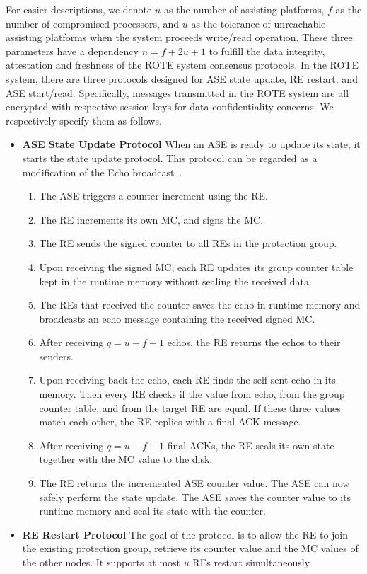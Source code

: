 For easier descriptions, we denote $n$ as the number of assisting platforms, $f$ as the number of compromised processors, and $u$ as the tolerance of  unreachable assisting platforms when the system proceeds write/read operation. These three parameters have a dependency $n = f + 2u + 1$ to fulfill the data integrity, attestation and freshness of the ROTE system consensus protocols. In the ROTE system, there are three protocols designed for ASE state update, RE restart, and ASE start/read. Specifically, messages transmitted in the ROTE system are all encrypted with respective session keys for data confidentiality concerns. We respectively specify them as follows.
\begin{itemize}
	\item \textbf{ASE State Update Protocol} When an ASE is ready to update its state, it starts the state update protocol. This protocol can be regarded as a modification of the Echo broadcast~\cite{}. 
	\begin{enumerate}
		\item The ASE triggers a counter increment using the RE.
		\item The RE increments its own MC, and signs the MC. 
		\item The RE sends the signed counter to all REs in the protection group.
		\item Upon receiving the signed MC, each RE updates its group counter table kept in the runtime memory without sealing the received data.
		\item The REs that received the counter saves the echo in runtime memory and broadcasts an echo message containing the received signed MC.
		\item After receiving $q=u+f+1$ echos, the RE returns the echos to their senders.
		\item Upon receiving back the echo, each RE finds the self-sent echo in its memory. Then every RE checks if the value from echo, from the group counter table, and from the target RE are equal. If these three values match each other, the RE replies with a final ACK message.
		\item After receiving $q=u+f+1$ final ACKs, the RE seals its own state together with the MC value to the disk.
		\item The RE returns the incremented ASE counter value. The ASE can now safely perform the state update. The ASE saves the counter value to its runtime memory and seal its state with the counter.
	\end{enumerate}
	\item \textbf{RE Restart Protocol} The goal of the protocol is to allow the RE to join the existing protection group, retrieve its counter value and the MC values of the other nodes. It supports at most $u$ REs restart simultaneously. 

\end{itemize}
